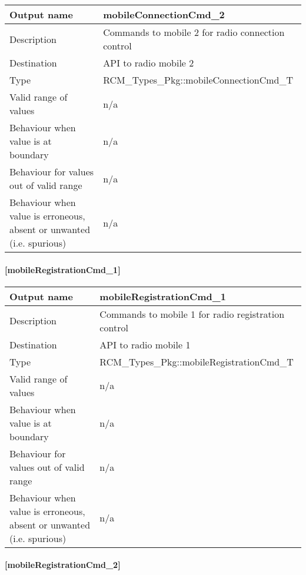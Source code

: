 \begin{longtable}{p{}p{}}
	\toprule
	Output name				& mobileConnectionCmd\_2 \\
	\midrule
	Description				& Commands to mobile 2 for radio connection control  \\
	\midrule
	Destination				& API to radio mobile 2 \\ 
	\midrule
	Type					& RCM\_Types\_Pkg::mobileConnectionCmd\_T \\
	\midrule
	Valid range of values	& n/a \\
	\midrule
	Behaviour when value is at boundary	& n/a \\
	\midrule
	Behaviour for values out of valid range	& n/a \\
	\midrule
	Behaviour when value is erroneous, absent or unwanted (i.e. spurious) & n/a \\
	\bottomrule
\end{longtable}

\paragraph{[mobileRegistrationCmd\_1]}

\begin{longtable}{p{}p{}}
	\toprule
	Output name				& mobileRegistrationCmd\_1 \\
	\midrule
	Description				& Commands to mobile 1 for radio registration control  \\
	\midrule
	Destination				& API to radio mobile 1 \\ 
	\midrule
	Type					& RCM\_Types\_Pkg::mobileRegistrationCmd\_T \\
	\midrule
	Valid range of values	& n/a \\
	\midrule
	Behaviour when value is at boundary	& n/a \\
	\midrule
	Behaviour for values out of valid range	& n/a \\
	\midrule
	Behaviour when value is erroneous, absent or unwanted (i.e. spurious) & n/a \\
	\bottomrule
\end{longtable}

\paragraph{[mobileRegistrationCmd\_2]}

